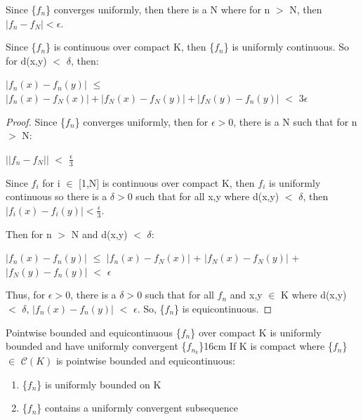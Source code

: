    \begin{intuition}
        Since \{$f_n$\} converges uniformly, then there is a N where for n $>$ N,
        then $|f_n - f_N| < \epsilon$.

        Since \{$f_n$\} is continuous over compact K, then
        \{$f_n$\} is uniformly continuous. So for d(x,y) $<$ $\delta$, then:

        \hspace{0.5cm}
        $|f_n(x) - f_n(y)|$
        $\leq$ $|f_n(x) - f_N(x)| + |f_N(x) - f_N(y)| + |f_N(y) - f_n(y)|$
        $<$ $3\epsilon$
    \end{intuition}

    \vspace{0.1cm}

    \begin{proof}
        Since \{$f_n$\} converges uniformly, then for $\epsilon > 0$, there is a
        N such that for n $>$ N:

        \hspace{0.5cm}
        $||f_n - f_N||$ $<$ $\frac{\epsilon}{3}$

        Since $f_i$ for i $\in$ [1,N] is continuous over compact K, then
        $f_i$ is uniformly continuous so there is a $\delta > 0$ such that for
        all x,y where d(x,y) $<$ $\delta$, then
        $|f_i(x) - f_i(y)| < \frac{\epsilon}{3}$.

        Then for n $>$ N and d(x,y) $<$ $\delta$:

        \hspace{0.5cm}
        $|f_n(x) - f_n(y)|$
        $\leq$ $|f_n(x) - f_N(x)|$ + $|f_N(x) - f_N(y)|$ + $|f_N(y) - f_n(y)|$
        $<$ $\epsilon$

        Thus, for $\epsilon > 0$, there is a $\delta > 0$ such that for all $f_n$
        and x,y $\in$ K where d(x,y) $<$ $\delta$,
        $|f_n(x) - f_n(y)|$ $<$ $\epsilon$.
        So, \{$f_n$\} is equicontinuous.
    \end{proof}

    \vspace{0.5cm}



    \begin{wtheorem}{Pointwise bounded and equicontinuous \{$f_n$\} over compact K
    is uniformly bounded and have uniformly convergent \{$f_{n_k}$\}}{16cm}
        If K is compact where \{$f_n$\} $\in$ $\mathscr{C}(K)$ is pointwise bounded
        and equicontinuous:

        \begin{enumerate}[label=(\alph*), leftmargin=1.5cm, itemsep=0.1cm]
            \item \{$f_n$\} is uniformly bounded on K
            
            \item \{$f_n$\} contains a uniformly convergent subsequence
        \end{enumerate}
    \end{wtheorem}

